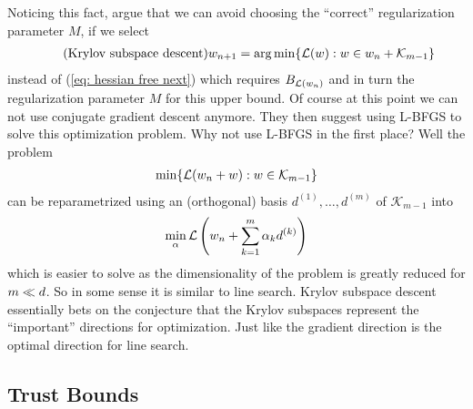 Noticing this fact, \textcite{vinyalsKrylovSubspaceDescent2012} argue that we
can avoid choosing the ``correct'' regularization parameter \(M\), if we
select
\begin{align}\label{eq: krylov subspace descent}
	\tag{Krylov subspace descent}
	w_{n+1}
	= \arg\min \{ \mathcal{L}(w) : w \in w_n + \mathcal{K}_{m-1} \}
\end{align}
instead of (\ref{eq: hessian free next}) which requires \(B_{\mathcal{L}(w_n)}\)
and in turn the regularization parameter \(M\) for this upper bound. Of course
at this point we can not use conjugate gradient descent anymore. They then suggest
using L-BFGS to solve this optimization problem. Why not use L-BFGS in the first
place? Well the problem
\begin{align*}
	\min \{ \mathcal{L}(w_n + w) : w \in \mathcal{K}_{m-1} \}
\end{align*}
can be reparametrized using an (orthogonal) basis \(d^{(1)}, \dots, d^{(m)}\)
of \(\mathcal{K}_{m-1}\) into
\begin{align*}
	\min_{\alpha} \mathcal{L}\left(w_n + \sum_{k=1}^m \alpha_k d^{(k)} \right)
\end{align*}
which is easier to solve as the dimensionality of the problem is greatly
reduced for \(m\ll d\). So in some sense it is similar to
line search. Krylov subspace descent essentially bets on the conjecture that the
Krylov subspaces represent the ``important'' directions for optimization. Just
like the gradient direction is the optimal direction for line search.

\subsection{Trust Bounds}\label{subsec: trust bounds}

